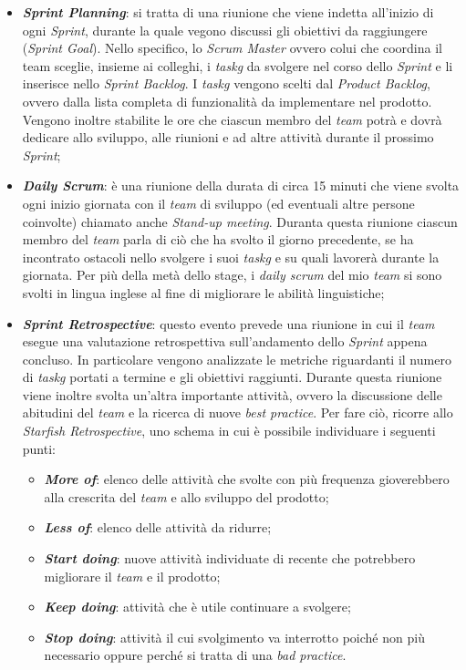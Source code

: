     \begin{itemize}
        \item \textit{\textbf{Sprint Planning}}: si tratta di una riunione che viene indetta all'inizio di ogni \textit{Sprint}, durante la quale vegono discussi gli obiettivi da raggiungere (\textit{Sprint Goal}). Nello specifico, lo \textit{Scrum Master} ovvero colui che coordina il team sceglie, insieme ai colleghi, i \textit{\gls{taskg}} da svolgere nel corso dello \textit{Sprint} e li inserisce nello \textit{Sprint Backlog}. I \textit{\gls{taskg}} vengono scelti dal \textit{Product Backlog}, ovvero dalla lista completa di funzionalità da implementare nel prodotto. Vengono inoltre stabilite le ore che ciascun membro del \textit{team} potrà e dovrà dedicare allo sviluppo, alle riunioni e ad altre attività durante il prossimo \textit{Sprint};
        \item \textit{\textbf{Daily Scrum}}: è una riunione della durata di circa 15 minuti che viene svolta ogni inizio giornata con il \textit{team} di sviluppo (ed eventuali altre persone coinvolte) chiamato anche \textit{Stand-up meeting}. Duranta questa riunione ciascun membro del \textit{team} parla di ciò che ha svolto il giorno precedente, se ha incontrato ostacoli nello svolgere i suoi \textit{\gls{taskg}} e su quali lavorerà durante la giornata. Per più della metà dello stage, i \textit{daily scrum} del mio \textit{team} si sono svolti in lingua inglese al fine di migliorare le abilità linguistiche;
        \item \textit{\textbf{Sprint Retrospective}}: questo evento prevede una riunione in cui il \textit{team} esegue una valutazione retrospettiva sull'andamento dello \textit{Sprint} appena concluso. In particolare vengono analizzate le metriche riguardanti il numero di \textit{\gls{taskg}} portati a termine e gli obiettivi raggiunti. Durante questa riunione viene inoltre svolta un'altra importante attività, ovvero la discussione delle abitudini del \textit{team} e la ricerca di nuove \textit{best practice}. Per fare ciò, ricorre allo \textit{Starfish Retrospective}, uno schema in cui è possibile individuare i seguenti punti:
            \begin{itemize}
                \item \textit{\textbf{More of}}: elenco delle attività che svolte con più frequenza gioverebbero alla crescrita del \textit{team} e allo sviluppo del prodotto;
                \item \textit{\textbf{Less of}}: elenco delle attività da ridurre;
                \item \textit{\textbf{Start doing}}: nuove attività individuate di recente che potrebbero migliorare il \textit{team} e il prodotto;
                \item \textit{\textbf{Keep doing}}: attività che è utile continuare a svolgere;
                \item \textit{\textbf{Stop doing}}: attività il cui svolgimento va interrotto poiché non più necessario oppure perché si tratta di una \textit{bad practice}.
            \end{itemize}
            

\end{itemize}
